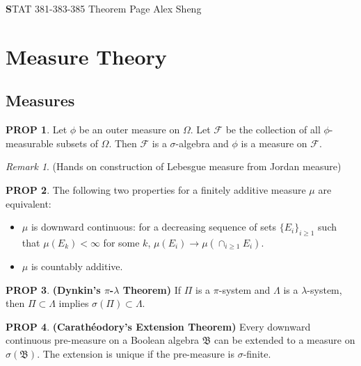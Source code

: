 \documentclass[hidelinks,11pt]{article}
\theoremstyle{definition}
\theoremstyle{dotless}
\newtheorem{prop}{PROP}[section]
\theoremstyle{remark}
\newtheorem*{remark}{Remark}
\DeclareMathOperator{\1}{\mathbf{1}}
\begin{document}
\begin{center}
{\Large\textbf STAT 381-383-385 \hspace{0.1cm} Theorem Page}\medbreak
\large{Alex Sheng}
\end{center}

\vspace{0.2 cm}
\tableofcontents

\newpage
\section{Measure Theory}

\subsection{Measures}

\begin{prop}
Let $\phi$ be an outer measure on $\Omega$. Let $\mathcal{F}$ be the collection of all $\phi$-measurable subsets of $\Omega$. Then $\mathcal{F}$ is a $\sigma$-algebra and $\phi$ is a measure on $\mathcal{F}$.
\end{prop}

\begin{remark}
(Hands on construction of Lebesgue measure from Jordan measure)
\end{remark}

\begin{prop}
The following two properties for a finitely additive measure $\mu$ are equivalent:\begin{itemize}
    \item $\mu$ is downward continuous: for a decreasing sequence of sets $\{E_i\}_{i\geq1}$ such that $\mu(E_k)<\infty$ for some $k$, $\mu(E_i)\to\mu(\cap_{i\geq1}E_i).$
    \item $\mu$ is countably additive.
\end{itemize}
\end{prop}

\begin{prop}\textup{\textbf{(Dynkin's $\pi$-$\lambda$ Theorem)}} If $\Pi$ is a $\pi$-system and $\Lambda$ is a $\lambda$-system, then $\Pi\subset\Lambda$ implies $\sigma(\Pi)\subset\Lambda$.
\end{prop}

\begin{prop}\textup{\textbf{(Carathéodory's Extension Theorem)}} Every downward continuous pre-measure on a Boolean algebra $\mathfrak{B}$ can be extended to a measure on $\sigma(\mathfrak{B})$. The extension is unique if the pre-measure is $\sigma$-finite.
\end{prop}
\end{document}

